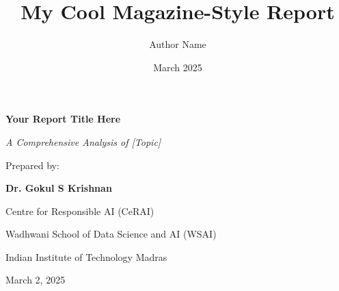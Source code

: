 \documentclass[11pt,a4paper,twoside]{paper}
\title{\textbf{\LARGE My Cool Magazine-Style Report}}
\author{Author Name}
\date{March 2025}
\begin{document}
\begin{titlepage}
\begin{center}


\vspace{2cm}

{\Huge\bfseries\color{iitblue} Your Report Title Here\par}
\vspace{1cm}
{\Large\itshape A Comprehensive Analysis of [Topic]\par}

\vfill

{\large Prepared by:\par}
{\Large \textbf{Dr. Gokul S Krishnan}\par}


\vfill
{\Large Centre for Responsible AI (CeRAI)\par}
{\Large Wadhwani School of Data Science and AI (WSAI)\par}
{\Large Indian Institute of Technology Madras\par}

\vfill

{\large March 2, 2025\par}

\end{center}
\end{titlepage}
\end{document}
